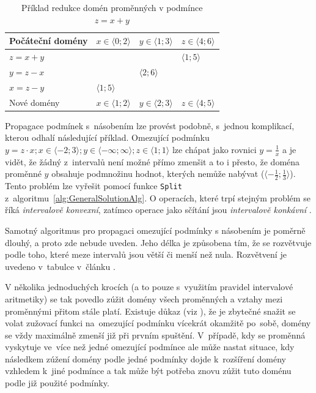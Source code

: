 \begin{table}
\centering
\begin{tabular}{|l|l|l|l|}
\hline
 Počáteční domény & $x \in \langle 0;2 \rangle$ & $y \in \langle 1;3 \rangle$ & $z \in \langle 4;6 \rangle$  \\ \hline
 $z = x+y$  &  & &  $\langle 1;5 \rangle$  \\ \hline
 $y = z-x$  & & $\langle 2;6 \rangle$  &  \\ \hline
 $x = z-y$  & $\langle 1;5 \rangle$  &  &  \\ \hline
 Nové domény & $x \in \langle 1;2 \rangle$ & $y \in \langle 2;3 \rangle$ & $z \in \langle 4;5 \rangle$ \\ \hline
\end{tabular}
\caption{Příklad redukce domén proměnných v podmínce $z = x + y$}
\label{narrowingTable}
\end{table}


Propagace podmínek s~násobením lze provést podobně, s~jednou komplikací, kterou odhalí následující příklad. Omezující podmínku $y = z \cdot x; x \in \langle -2;3 \rangle; y \in \langle -\infty ; \infty \rangle; z \in \langle 1;1 \rangle $ lze chápat jako rovnici $ y = \frac{1}{x}$ a je vidět, že žádný z~intervalů není možné přímo zmenšit a to i přesto, že doména proměnné $y$ obsahuje podmnožinu hodnot, kterých nemůže nabývat ($ \langle -\frac{1}{2};\frac{1}{3} \rangle $). Tento problém lze vyřešit pomocí funkce \verb|Split| z~algoritmu~\ref{alg:GeneralSolutionAlg}. O operacích, které trpí stejným problém se říká \emph{intervalově konvexní}, zatímco operace jako sčítání jsou \emph{intervalově konkávní} \cite{cleary87}.

Samotný algoritmus pro propagaci omezující podmínky s násobením je poměrně dlouhý, a proto zde nebude uveden. Jeho délka je způsobena tím, že se rozvětvuje podle toho, které meze intervalů jsou větší či menší než nula. Rozvětvení je uvedeno v~tabulce v~článku \cite{hickeyImplementation}.

V několika jednoduchých krocích (a to pouze s~využitím pravidel intervalové aritmetiky) se tak povedlo zúžit domény všech proměnných a vztahy mezi proměnnými přitom stále platí. Existuje důkaz (viz \cite{cleary87}), že je zbytečné snažit se volat zužovací funkci na~omezující podmínku vícekrát okamžitě po~sobě, domény se vždy maximálně zmenší již při prvním spuštění. V~případě, kdy se proměnná vyskytuje ve~více než jedné omezující podmínce ale může nastat situace, kdy následkem zúžení domény podle jedné podmínky dojde k~rozšíření domény vzhledem k~jiné podmínce a tak může být potřeba znovu zúžit tuto doménu podle již použité podmínky.





